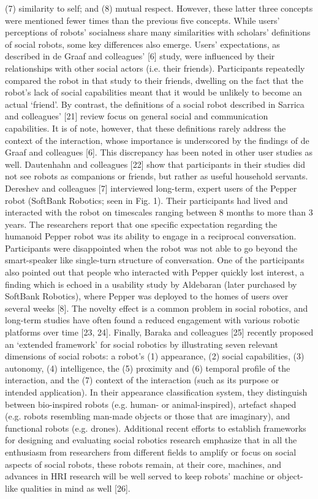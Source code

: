 (7) similarity to self; and (8) mutual respect. However, these latter three concepts were mentioned fewer times than the previous five concepts. While users’ perceptions of robots’ socialness share many similarities with scholars’ definitions of social robots, some key differences also emerge. Users’ expectations, as described in de Graaf and colleagues’ [6] study, were influenced by their relationships with other social actors (i.e. their friends). Participants repeatedly compared the robot in that study to their friends, dwelling on the fact that the robot’s lack of social capabilities meant that it would be unlikely to become an actual ‘friend’. By contrast, the definitions of a social robot described in Sarrica and colleagues’ [21] review focus on general social and communication capabilities. It is of note, however, that these definitions rarely address the context of the interaction, whose importance is underscored by the findings of de Graaf and colleagues [6]. This discrepancy has been noted in other user studies as well. Dautenhahn and colleagues [22] show that participants in their studies did not see robots as companions or friends, but rather as useful household servants. Dereshev and colleagues [7] interviewed long-term, expert users of the Pepper robot (SoftBank Robotics; seen in Fig. 1). Their participants had lived and interacted with the robot on timescales ranging between 8 months to more than 3 years. The researchers report that one specific expectation regarding the humanoid Pepper robot was its ability to engage in a reciprocal conversation. Participants were disappointed when the robot was not able to go beyond the smart-speaker like single-turn structure of conversation. One of the participants also pointed out that people who interacted with Pepper quickly lost interest, a finding which is echoed in a usability study by Aldebaran (later purchased by SoftBank Robotics), where Pepper was deployed to the homes of users over several weeks [8]. The novelty effect is a common problem in social robotics, and long-term studies have often found a reduced engagement with various robotic platforms over time [23, 24]. Finally, Baraka and colleagues [25] recently proposed an ‘extended framework’ for social robotics by illustrating seven relevant dimensions of social robots: a robot’s (1) appearance, (2) social capabilities, (3) autonomy, (4) intelligence, the (5) proximity and (6) temporal profile of the interaction, and the (7) context of the interaction (such as its purpose or intended application). In their appearance classification system, they distinguish between bio-inspired robots (e.g. human- or animal-inspired), artefact shaped (e.g. robots resembling man-made objects or those that are imaginary), and functional robots (e.g. drones). Additional recent efforts to establish frameworks for designing and evaluating social robotics research emphasize that in all the enthusiasm from researchers from different fields to amplify or focus on social aspects of social robots, these robots remain, at their core, machines, and advances in HRI research will be well served to keep robots’ machine or object-like qualities in mind as well [26].
